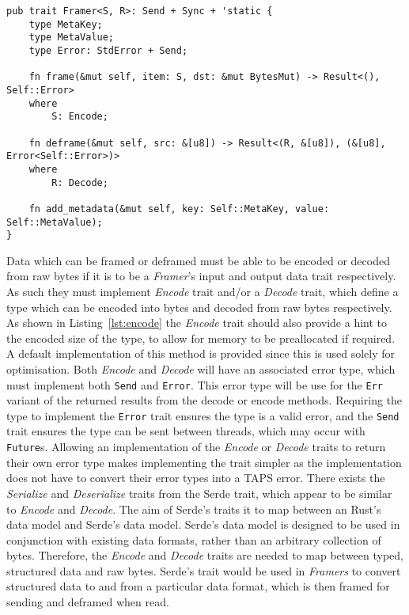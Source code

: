 \begin{lstlisting}[float=h, label=lst:framer, caption={The Framer trait, showing the Send and 'static
    requirements for all implementers, and associated types.}]
pub trait Framer<S, R>: Send + Sync + 'static {
    type MetaKey;
    type MetaValue;
    type Error: StdError + Send;

    fn frame(&mut self, item: S, dst: &mut BytesMut) -> Result<(), Self::Error>
    where
        S: Encode;

    fn deframe(&mut self, src: &[u8]) -> Result<(R, &[u8]), (&[u8], Error<Self::Error>)>
    where
        R: Decode;

    fn add_metadata(&mut self, key: Self::MetaKey, value: Self::MetaValue);
}
\end{lstlisting}

Data which can be framed or deframed must be able to be encoded or decoded from raw bytes if it is to be a
\emph{Framer}'s input and output data trait respectively.
As such they must implement \emph{Encode} trait and/or a \emph{Decode} trait, which define a type which can be encoded
into bytes and decoded from raw bytes respectively.
As shown in Listing~\ref{lst:encode} the \emph{Encode} trait should also provide a hint to the encoded size of the type,
to allow for memory to be preallocated if required.
A default implementation of this method is provided since this is used solely for optimisation.
Both \emph{Encode} and \emph{Decode} will have an associated error type, which must implement both \texttt{Send} and
\texttt{Error}.
This error type will be use for the \texttt{Err} variant of the returned results from the decode or encode methods.
Requiring the type to implement the \texttt{Error} trait ensures the type is a valid error, and the \texttt{Send} trait
ensures the type can be sent between threads, which may occur with \texttt{Future}s.
Allowing an implementation of the \emph{Encode} or \emph{Decode} traits to return their own error type makes
implementing the trait simpler as the implementation does not have to convert their error types into a TAPS error.
There exists the \emph{Serialize} and \emph{Deserialize} traits from the Serde trait, which appear to be similar to
\emph{Encode} and \emph{Decode}.
The aim of Serde's traits it to map between an Rust's data model and Serde's data model.
Serde's data model is designed to be used in conjunction with existing data formats, rather than an arbitrary collection
of bytes.
Therefore, the \emph{Encode} and \emph{Decode} traits are needed to map between typed, structured data and raw bytes.
Serde's trait would be used in \emph{Framers} to convert structured data to and from a particular data format, which is
then framed for sending and deframed when read.

